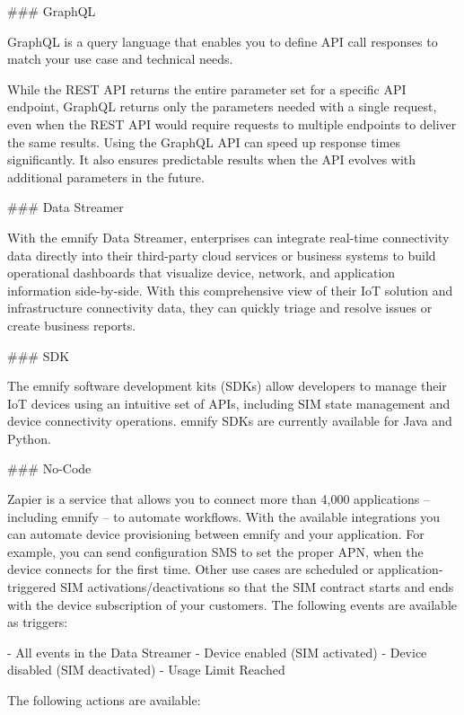 \documentclass[11pt, oneside]{article}   	%
\newcommand{\addspace}{\vspace{2mm}}
\begin{document}
\begin{markdown}
### GraphQL

GraphQL is a query language that enables you to define API call responses to match your use case and technical needs.

While the REST API returns the entire parameter set for a specific API endpoint, GraphQL returns only the parameters needed with a single request, even when the REST API would require requests to multiple endpoints to deliver the same results.
Using the GraphQL API can speed up response times significantly.
It also ensures predictable results when the API evolves with additional parameters in the future.

### Data Streamer

With the emnify Data Streamer, enterprises can integrate real-time connectivity data directly into their third-party cloud services or business systems to build operational dashboards that visualize device, network, and application information side-by-side.
With this comprehensive view of their IoT solution and infrastructure connectivity data, they can quickly triage and resolve issues or create business reports.

### SDK

The emnify software development kits (SDKs) allow developers to manage their IoT devices using an intuitive set of APIs, including SIM state management and device connectivity operations.
emnify SDKs are currently available for Java and Python.

### No-Code

Zapier is a service that allows you to connect more than 4,000 applications -- including emnify -- to automate workflows.
With the available integrations you can automate device provisioning between emnify and your application.
For example, you can send configuration SMS to set the proper APN, when the device connects for the first time.
Other use cases are scheduled or application-triggered SIM activations/deactivations so that the SIM contract starts and ends with the device subscription of your customers.
The following events are available as triggers:
\end{markdown}
\addspace
\begin{markdown}
- All events in the Data Streamer
- Device enabled (SIM activated)
- Device disabled (SIM deactivated)
- Usage Limit Reached
\end{markdown}
\addspace
\begin{markdown}

The following actions are available:

\end{markdown}
\end{document}
